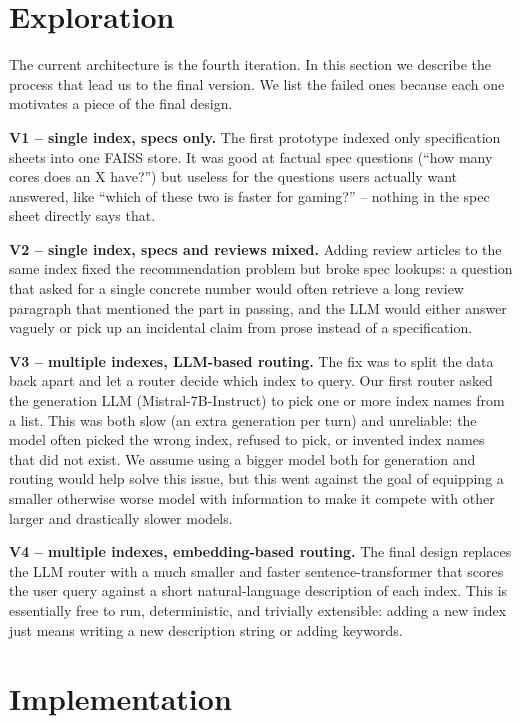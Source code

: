 \documentclass[fleqn,moreauthors,10pt]{ds_report}
\begin{document}
\section*{Exploration}
 
The current architecture is the fourth iteration. In this section we describe the process that lead us to the final version. We list the failed ones because each one motivates a piece of the final design.
 
\textbf{V1 -- single index, specs only.} The first prototype indexed only specification sheets into one FAISS store. It was good at factual spec questions (``how many cores does an X have?'') but useless for the questions users actually want answered, like ``which of these two is faster for gaming?'' -- nothing in the spec sheet directly says that.
 
\textbf{V2 -- single index, specs and reviews mixed.} Adding review articles to the same index fixed the recommendation problem but broke spec lookups: a question that asked for a single concrete number would often retrieve a long review paragraph that mentioned the part in passing, and the LLM would either answer vaguely or pick up an incidental claim from prose instead of a specification.
 
\textbf{V3 -- multiple indexes, LLM-based routing.} The fix was to split the data back apart and let a router decide which index to query. Our first router asked the generation LLM (Mistral-7B-Instruct) to pick one or more index names from a list. This was both slow (an extra generation per turn) and unreliable: the model often picked the wrong index, refused to pick, or invented index names that did not exist. We assume using a bigger model both for generation and routing would help solve this issue, but this went against the goal of equipping a smaller otherwise worse model with information to make it compete with other larger and drastically slower models.
 
\textbf{V4 -- multiple indexes, embedding-based routing.} The final design replaces the LLM router with a much smaller and faster sentence-transformer that scores the user query against a short natural-language description of each index. This is essentially free to run, deterministic, and trivially extensible: adding a new index just means writing a new description string or adding keywords.

\section*{Implementation}
 
\end{document}
